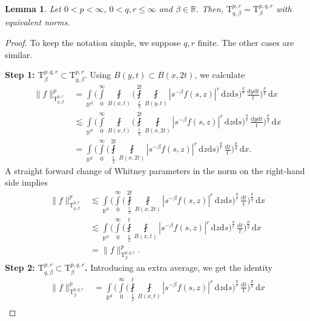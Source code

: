\documentclass[11pt, leqno,parskip=half]{amsart}
\newtheorem{lemma}[theorem]{Lemma}
\theoremstyle{definition}
\newcommand{\IR}{\mathbb{R}}
\renewcommand{\T}{\mathrm{T}}
\renewcommand{\d}{\mathrm{d}}
\numberwithin{equation}{section}
\begin{document}
\begin{lemma}
    Let $0<p<\infty$, $0<q,r\leq \infty$ and $\beta\in\IR$. Then, $\T^{p,r}_{q,\beta}=\T^{p,q,r}_\beta$ with equivalent norms.
\end{lemma}

\begin{proof}
    To keep the notation simple, we suppose $q,r$ finite. The other cases are similar.

    \textbf{Step 1: $\T^{p,q,r}_\beta \subset \T^{p,r}_{q,\beta}$}.
    Using $B(y,t) \subset B(x, 2t)$, we calculate
    \begin{align*}
        \|f\|_{\T^{p,r}_{q,\beta}}^p &=\int\limits_{\IR^d}\bigg(\int\limits_0^\infty\fint\limits_{B(x,t)} \bigg(\fint\limits_{\frac{t}{2}}^{2t} \fint\limits_{B(y,t)} |s^{-\beta}f(s,z)|^r \,\d z \d s\bigg)^\frac{q}{r}\,\frac{\d y\d t}{t}\bigg)^\frac{p}{q}\,\d x\\
        &\lesssim \int\limits_{\IR^d}\bigg(\int\limits_0^\infty\fint\limits_{B(x,t)} \bigg(\fint\limits_{\frac{t}{2}}^{2t} \fint\limits_{B(x,2t)} |s^{-\beta}f(s,z)|^r \,\d z \d s\bigg)^\frac{q}{r}\,\frac{\d y\d t}{t}\bigg)^\frac{p}{q}\,\d x\\
        &=\int\limits_{\IR^d}\bigg(\int\limits_0^\infty \bigg(\fint\limits_{\frac{t}{2}}^{2t} \fint\limits_{B(x,2t)} |s^{-\beta}f(s,z)|^r \,\d z \d s\bigg)^\frac{q}{r}\,\frac{\d t}{t}\bigg)^\frac{p}{q}\,\d x.
    \end{align*}
    A straight forward change of Whitney parameters in the norm on the right-hand side implies
    \begin{align*}
        \|f\|_{\T^{p,r}_{q,\beta}}^p &\lesssim\int\limits_{\IR^d}\bigg(\int\limits_0^\infty \bigg(\fint\limits_{\frac{t}{2}}^{2t} \fint\limits_{B(x,2t)} |s^{-\beta}f(s,z)|^r \,\d z \d s\bigg)^\frac{q}{r}\,\frac{\d t}{t}\bigg)^\frac{p}{q}\,\d x\\
        &\lesssim \int\limits_{\IR^d}\bigg(\int\limits_0^\infty \bigg(\fint\limits_{\frac{t}{2}}^{t} \fint\limits_{B(x,t)} |s^{-\beta}f(s,z)|^r \,\d z \d s\bigg)^\frac{q}{r}\,\frac{\d t}{t}\bigg)^\frac{p}{q}\,\d x\\
        &= \|f\|_{\T^{p,q,r}_\beta}^p.
    \end{align*}
     \textbf{Step 2: $ \T^{p,r}_{q,\beta}\subset \T^{p,q,r}_\beta $.}
    Introducing an extra average, we get the identity
    \begin{align*}
        \|f\|_{\T^{p,q,r}_\beta}^p &=\int\limits_{\IR^d}\bigg(\int\limits_0^\infty \bigg(\fint\limits_{\frac{t}{2}}^{t} \fint\limits_{B(x,t)} |s^{-\beta}f(s,z)|^r \,\d z \d s\bigg)^\frac{q}{r}\,\frac{\d t}{t}\bigg)^\frac{p}{q}\,\d x\\

\end{align*}
\end{proof}
\end{document}
